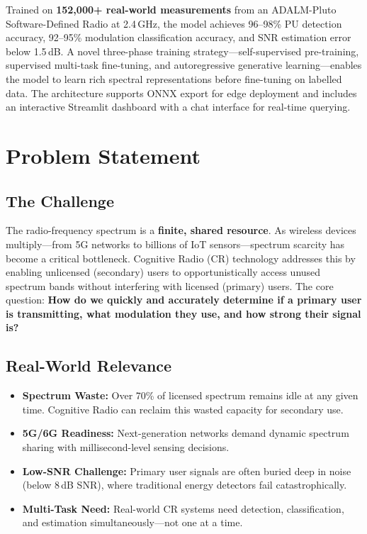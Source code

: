 \documentclass[12pt,a4paper]{article}
\begin{document}
Trained on \textbf{152,000+ real-world measurements} from an ADALM-Pluto Software-Defined Radio at 2.4\,GHz, the model achieves 96--98\% PU detection accuracy, 92--95\% modulation classification accuracy, and SNR estimation error below 1.5\,dB. A novel three-phase training strategy---self-supervised pre-training, supervised multi-task fine-tuning, and autoregressive generative learning---enables the model to learn rich spectral representations before fine-tuning on labelled data. The architecture supports ONNX export for edge deployment and includes an interactive Streamlit dashboard with a chat interface for real-time querying.

\section{Problem Statement}

\subsection{The Challenge}
The radio-frequency spectrum is a \textbf{finite, shared resource}. As wireless devices multiply---from 5G networks to billions of IoT sensors---spectrum scarcity has become a critical bottleneck. Cognitive Radio (CR) technology addresses this by enabling unlicensed (secondary) users to opportunistically access unused spectrum bands without interfering with licensed (primary) users. The core question: \textbf{How do we quickly and accurately determine if a primary user is transmitting, what modulation they use, and how strong their signal is?}

\subsection{Real-World Relevance}
\begin{itemize}[leftmargin=1.5em]
\item \textbf{Spectrum Waste:} Over 70\% of licensed spectrum remains idle at any given time. Cognitive Radio can reclaim this wasted capacity for secondary use.
\item \textbf{5G/6G Readiness:} Next-generation networks demand dynamic spectrum sharing with millisecond-level sensing decisions.
\item \textbf{Low-SNR Challenge:} Primary user signals are often buried deep in noise (below 8\,dB SNR), where traditional energy detectors fail catastrophically.
\item \textbf{Multi-Task Need:} Real-world CR systems need detection, classification, and estimation simultaneously---not one at a time.
\end{itemize}
\end{document}
